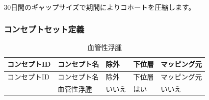 \documentclass[
  11pt]{book}
\theoremstyle{definition}
\theoremstyle{definition}
\theoremstyle{definition}
\theoremstyle{definition}
\theoremstyle{remark}
\begin{document}
30日間のギャップサイズで期間によりコホートを圧縮します。

\subsubsection*{コンセプトセット定義}\label{ux30b3ux30f3ux30bbux30d7ux30c8ux30bbux30c3ux30c8ux5b9aux7fa9-3}

\begin{longtable}[]{@{}lllll@{}}
\caption{\label{tab:angioedema} 血管性浮腫}\tabularnewline
\toprule\noalign{}
コンセプトID & コンセプト名 & 除外 & 下位層 & マッピング元 \\
\midrule\noalign{}
\endfirsthead
\toprule\noalign{}
コンセプトID & コンセプト名 & 除外 & 下位層 & マッピング元 \\
\midrule\noalign{}
\endhead
\bottomrule\noalign{}
\endlastfoot
432791 & 血管性浮腫 & いいえ & はい & いいえ \\
\end{longtable}
\end{document}
